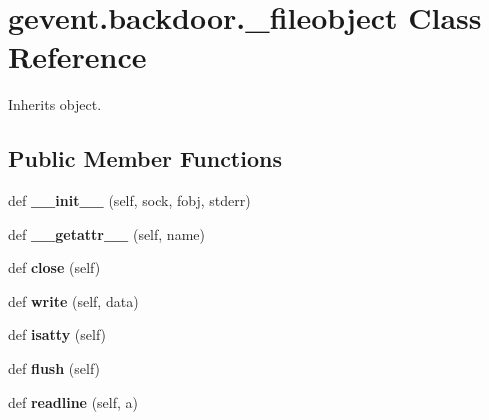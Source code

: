 \hypertarget{classgevent_1_1backdoor_1_1__fileobject}{}\section{gevent.\+backdoor.\+\_\+fileobject Class Reference}
\label{classgevent_1_1backdoor_1_1__fileobject}


Inherits object.

\subsection*{Public Member Functions}
\begin{DoxyCompactItemize}
\item 
\mbox{\label{classgevent_1_1backdoor_1_1__fileobject_af4ba2a94908de0a43c89725e87783b50}} 
def {\bfseries \+\_\+\+\_\+init\+\_\+\+\_\+} (self, sock, fobj, stderr)
\item 
\mbox{\label{classgevent_1_1backdoor_1_1__fileobject_af9ad034a47152294526e47df314be65e}} 
def {\bfseries \+\_\+\+\_\+getattr\+\_\+\+\_\+} (self, name)
\item 
\mbox{\label{classgevent_1_1backdoor_1_1__fileobject_a662c60042aeb70e5503da9476e295219}} 
def {\bfseries close} (self)
\item 
\mbox{\label{classgevent_1_1backdoor_1_1__fileobject_a38100d1e007a5ba11e67efaa1cf951b5}} 
def {\bfseries write} (self, data)
\item 
\mbox{\label{classgevent_1_1backdoor_1_1__fileobject_acc9f551036315ed18cd4764f645e90ea}} 
def {\bfseries isatty} (self)
\item 
\mbox{\label{classgevent_1_1backdoor_1_1__fileobject_a3be7b7a197b698f6b22d232cbbd37fbc}} 
def {\bfseries flush} (self)
\item 
\mbox{\label{classgevent_1_1backdoor_1_1__fileobject_a0ae10658d347578588aff484ab198e7d}} 
def {\bfseries readline} (self, a)
\end{DoxyCompactItemize}
